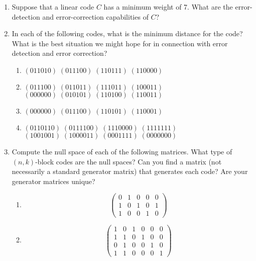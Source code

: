 {\begin{enumerate}
 
\item  %
Suppose that a linear code $C$ has a minimum weight of 7. What are the
error-detection and error-correction capabilities of $C$?
 
 
\item
In each of the following codes, what is the minimum distance for the
code? What is the best situation we might hope for in connection with
error detection and error correction? 
\begin{enumerate}
 
 \item
$(011010) \; (011100) \; (110111) \; (110000)$
 
 \item
$(011100) \; (011011) \; (111011) \; (100011)$ \\
$(000000) \; (010101) \; (110100) \; (110011)$
 
 \item
$(000000) \; (011100) \; (110101) \; (110001)$
 
 \item
$(0110110) \; (0111100) \; (1110000) \; (1111111)$ \\
$(1001001) \; (1000011) \; (0001111) \; (0000000)$
 
\end{enumerate}
 

 
\item
Compute the null space of each of the following matrices.  What type
of $(n,k)$-block codes are the null spaces? Can you find a matrix (not
necessarily a standard generator matrix) that generates each code?
Are your generator matrices unique?
\begin{multicols}{2}
\begin{enumerate}

\item
\[
\begin{pmatrix}
0 & 1 & 0 & 0 & 0 \\
1 & 0 & 1 & 0 & 1 \\
1 & 0 & 0 & 1 & 0
\end{pmatrix}
\]

\item
\[
\begin{pmatrix}
1 & 0 & 1 & 0 & 0 & 0 \\
1 & 1 & 0 & 1 & 0 & 0 \\
0 & 1 & 0 & 0 & 1 & 0 \\
1 & 1 & 0 & 0 & 0 & 1
\end{pmatrix}
\]


\end{enumerate}
\end{multicols}
\end{enumerate}}
